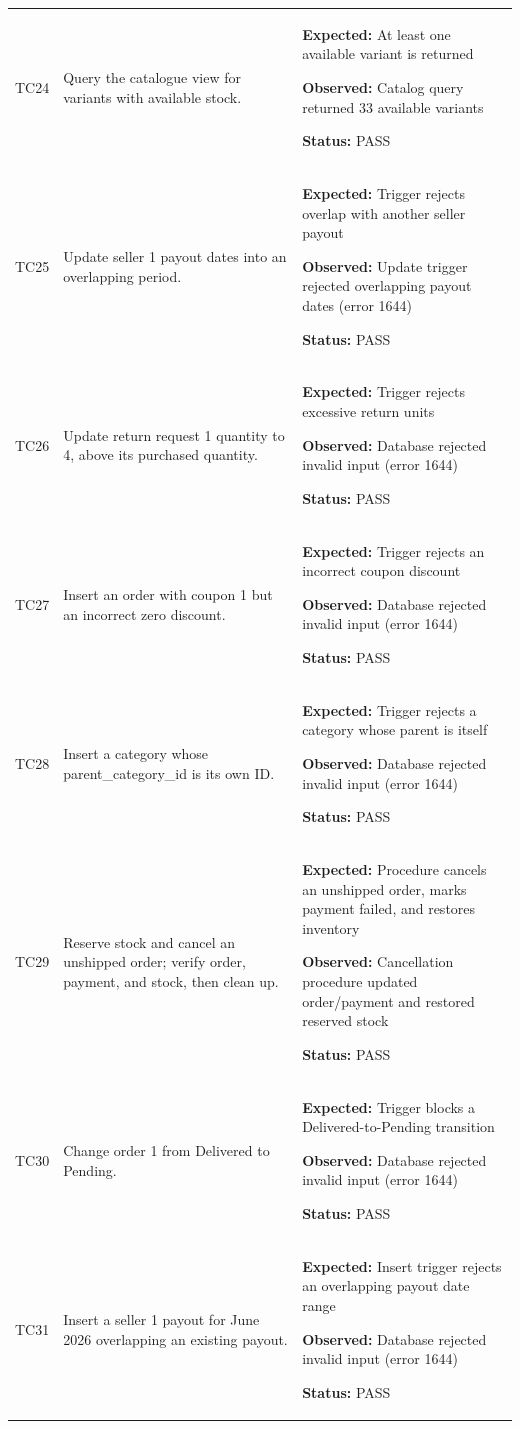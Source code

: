 \documentclass[11pt,a4paper,oneside]{report}
\begin{document}
\begin{longtable}{@{}P{13mm}P{51mm}P{92mm}@{}}
TC24 & Query the catalogue view for variants with available stock. & \textbf{Expected:} At least one available variant is returned\par\textbf{Observed:} Catalog query returned 33 available variants\par\textbf{Status:} PASS \\
TC25 & Update seller 1 payout dates into an overlapping period. & \textbf{Expected:} Trigger rejects overlap with another seller payout\par\textbf{Observed:} Update trigger rejected overlapping payout dates (error 1644)\par\textbf{Status:} PASS \\
TC26 & Update return request 1 quantity to 4, above its purchased quantity. & \textbf{Expected:} Trigger rejects excessive return units\par\textbf{Observed:} Database rejected invalid input (error 1644)\par\textbf{Status:} PASS \\
TC27 & Insert an order with coupon 1 but an incorrect zero discount. & \textbf{Expected:} Trigger rejects an incorrect coupon discount\par\textbf{Observed:} Database rejected invalid input (error 1644)\par\textbf{Status:} PASS \\
TC28 & Insert a category whose parent\_category\_id is its own ID. & \textbf{Expected:} Trigger rejects a category whose parent is itself\par\textbf{Observed:} Database rejected invalid input (error 1644)\par\textbf{Status:} PASS \\
TC29 & Reserve stock and cancel an unshipped order; verify order, payment, and stock, then clean up. & \textbf{Expected:} Procedure cancels an unshipped order, marks payment failed, and restores inventory\par\textbf{Observed:} Cancellation procedure updated order/payment and restored reserved stock\par\textbf{Status:} PASS \\
TC30 & Change order 1 from Delivered to Pending. & \textbf{Expected:} Trigger blocks a Delivered-to-Pending transition\par\textbf{Observed:} Database rejected invalid input (error 1644)\par\textbf{Status:} PASS \\
TC31 & Insert a seller 1 payout for June 2026 overlapping an existing payout. & \textbf{Expected:} Insert trigger rejects an overlapping payout date range\par\textbf{Observed:} Database rejected invalid input (error 1644)\par\textbf{Status:} PASS \\

\end{longtable}
\end{document}

